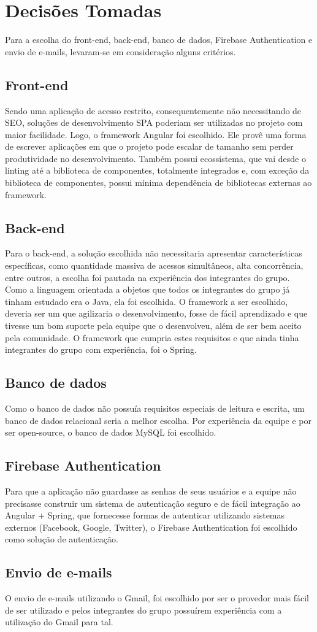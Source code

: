 \chapter[Decisões Tomadas]{Decisões Tomadas}
Para a escolha do front-end, back-end, banco de dados, Firebase Authentication e envio de e-mails, levaram-se em consideração alguns critérios.

\section{Front-end}
Sendo uma aplicação de acesso restrito, consequentemente não necessitando de SEO, soluções de desenvolvimento SPA poderiam ser utilizadas no projeto com maior facilidade. Logo, o framework Angular foi escolhido. Ele provê uma forma de escrever aplicações em que o projeto pode escalar de tamanho sem perder produtividade no desenvolvimento. Também possui ecossistema, que vai desde o linting até a biblioteca de componentes, totalmente integrados e, com exceção da biblioteca de componentes, possui mínima dependência de bibliotecas externas ao framework.

\section{Back-end}
Para o back-end, a solução escolhida não necessitaria apresentar características específicas, como quantidade massiva de acessos simultâneos, alta concorrência, entre outros, a escolha foi pautada na experiência dos integrantes do grupo. Como a linguagem orientada a objetos que todos os integrantes do grupo já tinham estudado era o Java, ela foi escolhida. O framework a ser escolhido, deveria ser um que agilizaria o desenvolvimento, fosse de fácil aprendizado e que tivesse um bom suporte pela equipe que o desenvolveu, além de ser bem aceito pela comunidade. O framework que cumpria estes requisitos e que ainda tinha integrantes do grupo com experiência, foi o Spring.

\section{Banco de dados}
Como o banco de dados não possuía requisitos especiais de leitura e escrita, um banco de dados relacional seria a melhor escolha. Por experiência da equipe e por ser open-source, o banco de dados MySQL foi escolhido.

\section{Firebase Authentication}
Para que a aplicação não guardasse as senhas de seus usuários e a equipe não precisasse construir um sistema de autenticação seguro e de fácil integração ao Angular + Spring, que fornecesse formas de autenticar utilizando sistemas externos (Facebook, Google, Twitter), o Firebase Authentication foi escolhido como solução de autenticação.


\section{Envio de e-mails}
O envio de e-mails utilizando o Gmail, foi escolhido por ser o provedor mais fácil de ser utilizado e pelos integrantes do grupo possuírem experiência com a utilização do Gmail para tal.
